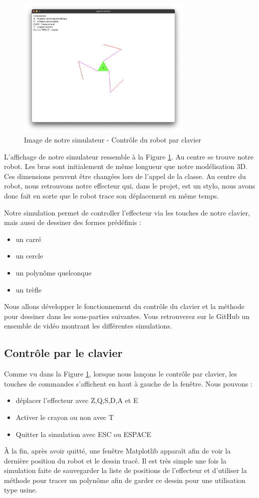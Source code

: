 \documentclass[a4paper, 11pt]{report}
\begin{document}
\begin{figure}[!htb]
    \centering
    \includegraphics[width=0.75\textwidth]{Figures/image_affichagesimu.png}
    \caption{Image de notre simulateur - Contrôle du robot par clavier}
    \label{fig:image_simu}
\end{figure}
L'affichage de notre simulateur ressemble à la Figure \ref{fig:image_simu}. Au centre se trouve notre robot. Les bras sont initialement de même longueur que notre modélisation 3D. Ces dimensions peuvent être changées lors de l'appel de la classe. Au centre du robot, nous retrouvons notre effecteur qui, dans le projet, est un stylo, nous avons donc fait en sorte que le robot trace son déplacement en même temps. 

Notre simulation permet de controller l'effecteur via les touches de notre clavier, mais aussi de dessiner des formes prédéfinis :
\begin{itemize}
    \item un carré
    \item un cercle
    \item un polynôme quelconque
    \item un trèfle
\end{itemize}
Nous allons développer le fonctionnement du contrôle du clavier et la méthode pour dessiner dans les sous-parties suivantes. Vous retrouverez sur le GitHub un ensemble de vidéo montrant les différentes simulations.

\subsection{Contrôle par le clavier}
Comme vu dans la Figure \ref{fig:image_simu}, lorsque nous lançons le contrôle par clavier, les touches de commandes s'affichent en haut à gauche de la fenêtre. Nous pouvons :
\begin{itemize}
    \item déplacer l'effecteur avec Z,Q,S,D,A et E
    \item Activer le crayon ou non avec T
    \item Quitter la simulation avec ESC ou ESPACE
\end{itemize}
À la fin, après avoir quitté, une fenêtre Matplotlib apparaît afin de voir la dernière position du robot et le dessin tracé. Il est très simple une fois la simulation faite de sauvegarder la liste de positions de l'effecteur et d'utiliser la méthode pour tracer un polynôme afin de garder ce dessin pour une utilisation type usine.
\end{document}
